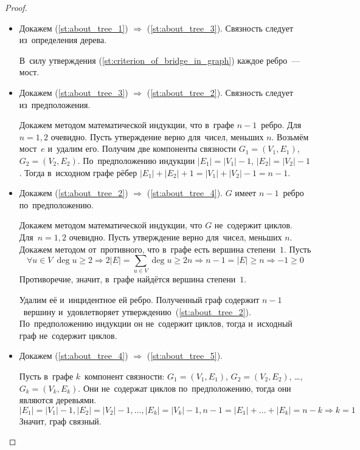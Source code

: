 \begin{proof}
\begin{itemize}
	\item Докажем (\ref{st:about_tree_1}) $\Rightarrow$ (\ref{st:about_tree_3}).
	Связность следует из~определения дерева.
	
	В~силу утверждения (\ref{st:criterion_of_bridge_in_graph}) каждое ребро~--- мост.
	
	\item Докажем (\ref{st:about_tree_3}) $\Rightarrow$ (\ref{st:about_tree_2}).
	Связность следует из~предположения.
	
	Докажем методом математической индукции, что в~графе $n - 1$~ребро.
	\indbase Для~$n = 1, 2$ очевидно.
	\indstep Пусть утверждение верно для~чисел, меньших $n$.
	Возьмём мост~$e$ и~удалим его.
	Получим две компоненты связности $G_1 = (V_1, E_1)$, $G_2 = (V_2, E_2)$.
	По~предположению индукции $|E_1| = |V_1| - 1$, $|E_2| = |V_2| - 1$.
	Тогда в~исходном графе рёбер $|E_1| + |E_2| + 1 = |V_1| + |V_2| - 1 = n - 1$. \indend
	
	\item Докажем (\ref{st:about_tree_2}) $\Rightarrow$ (\ref{st:about_tree_4}).
	$G$ имеет $n - 1$~ребро по~предположению.
	
	Докажем методом математической индукции, что $G$ не~содержит циклов.
	\indbase Для~$n = 1, 2$ очевидно.
	\indstep Пусть утверждение верно для~чисел, меньших $n$.
	Докажем методом от~противного, что в~графе есть вершина степени~$1$.
	Пусть
	\begin{equation*}
	\forall u \in V \ \deg u \geqslant 2 \Rightarrow 2|E| = \sum_{u \in V} \deg u \geqslant 2n \Rightarrow n - 1 = |E| \geqslant n \Rightarrow -1 \geqslant 0
	\end{equation*}
	Противоречие, значит, в~графе найдётся вершина степени~$1$.
	
	Удалим её и~инцидентное ей ребро.
	Полученный граф содержит $n - 1$~вершину и~удовлетворяет утверждению~(\ref{st:about_tree_2}).
	По~предположению индукции он не~содержит циклов, тогда и~исходный граф не~содержит циклов. \indend
	
	\item Докажем (\ref{st:about_tree_4}) $\Rightarrow$ (\ref{st:about_tree_5}).
	
	Пусть в~графе $k$~компонент связности: $G_1 = (V_1, E_1)$, $G_2 = (V_2, E_2)$, \ldots, $G_k = (V_k, E_k)$.
	Они не~содержат циклов по~предположению, тогда они являются деревьями.
	\begin{equation*}
	|E_1| = |V_1| - 1, |E_2| = |V_2| - 1, \ldots, |E_k| = |V_k| - 1,
	n - 1 = |E_1| + \ldots + |E_k| = n - k \Rightarrow k = 1
	\end{equation*}
	Значит, граф связный.
	

\end{itemize}
\end{proof}
